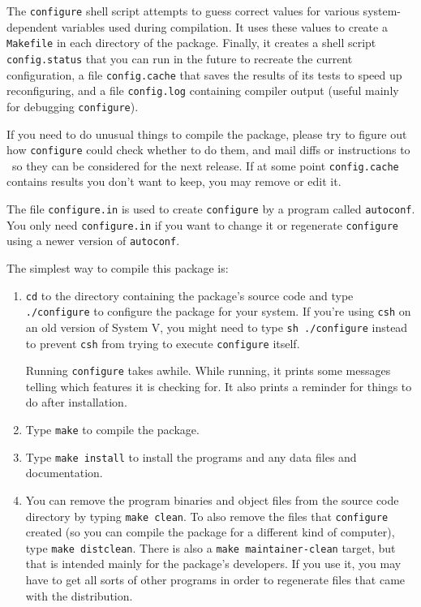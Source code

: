 \begin{appendix}
   The \verb+configure+ shell script attempts to guess correct values for
various system-dependent variables used during compilation.  It uses
these values to create a \verb+Makefile+ in each directory of the package.
Finally, it creates a shell script \verb+config.status+ that
you can run in the future to recreate the current configuration, a file
\verb+config.cache+ that saves the results of its tests to speed up
reconfiguring, and a file \verb+config.log+ containing compiler output
(useful mainly for debugging \verb+configure+).

   If you need to do unusual things to compile the package, please try
to figure out how \verb+configure+ could check whether to do them, and mail
diffs or instructions to \bugs\ so they can
be considered for the next release.  If at some point \verb+config.cache+
contains results you don't want to keep, you may remove or edit it.

   The file \verb+configure.in+ is used to create \verb+configure+ by a program
called \verb+autoconf+.  You only need \verb+configure.in+ 
if you want to change it or regenerate \verb+configure+ using a newer 
version of \verb+autoconf+.

The simplest way to compile this package is:
\begin{enumerate}
\item \verb+cd+ to the directory containing the package's source code and type
     \verb+./configure+ to configure the package for your system.  If you're
     using \verb+csh+ on an old version of System V, you might need to type
     \verb+sh ./configure+ instead to prevent \verb+csh+ from trying to execute
     \verb+configure+ itself.

     Running \verb+configure+ takes awhile.  While running, it prints some
     messages telling which features it is checking for. It also prints
     a reminder for things to do after installation.

\item Type \verb+make+ to compile the package.

\item Type \verb+make install+ to install the programs and any data files and
     documentation.

\item You can remove the program binaries and object files from the
     source code directory by typing \verb+make clean+.  To also remove the
     files that \verb+configure+ created (so you can compile the package for
     a different kind of computer), type \verb+make distclean+.  There is
     also a \verb+make maintainer-clean+ target, but that is intended mainly
     for the package's developers.  If you use it, you may have to get
     all sorts of other programs in order to regenerate files that came
     with the distribution.


\end{enumerate}
\end{appendix}

